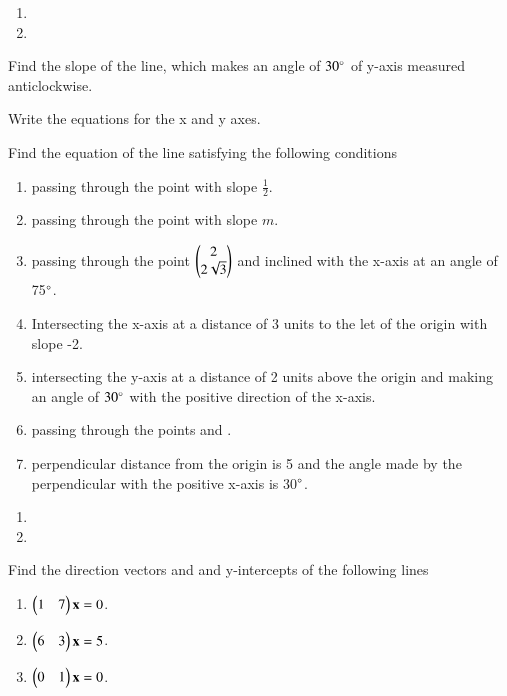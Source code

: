 %
\solution
\begin{enumerate}
\item 
\item 

\end{enumerate}
%
\item Find the slope of the line, which makes an angle of $30\degree$ of y-axis measured anticlockwise.
\item Write the equations for the x and y axes.
\item Find the equation of the line satisfying the following conditions 
\begin{enumerate}
\item passing through  the point  with slope $\frac{1}{2}$.
\item passing through the point  with slope $m$.
\item passing through the point $\begin{pmatrix}2\\2\sqrt{3}\end{pmatrix}$ and inclined with the x-axis at an angle of 75$\degree$.
\item Intersecting the x-axis at a distance of 3 units to the let of the origin with slope -2.
\item intersecting the y-axis at a distance of 2 units above the origin and making an angle of $30\degree$ with the positive direction of the x-axis.
\item passing through the points  and .
\item perpendicular distance from the origin is 5 and the angle made by the perpendicular with the positive x-axis is 30$\degree$.
\end{enumerate}
%
\solution
\begin{enumerate}
\item 
\item 
\end{enumerate}

\item Find the direction vectors and and y-intercepts  of the following lines 
\begin{enumerate}
\item $\begin{pmatrix}1 & 7\end{pmatrix}\mathbf{x} = 0$.
\item $\begin{pmatrix}6 & 3\end{pmatrix}\mathbf{x} = 5$.
\item $\begin{pmatrix}0 & 1\end{pmatrix}\mathbf{x} = 0$.
\end{enumerate}

